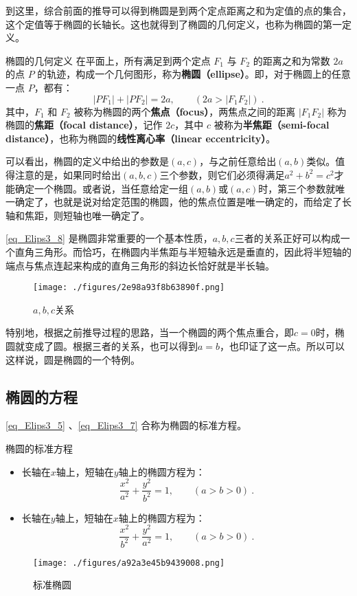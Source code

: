 到这里，综合前面的推导可以得到椭圆是到两个定点距离之和为定值的点的集合，这个定值等于椭圆的长轴长。这也就得到了椭圆的几何定义，也称为椭圆的第一定义。

\begin{definition}{椭圆的几何定义}
在平面上，所有满足到两个定点 $F_1$ 与 $F_2$ 的距离之和为常数 $2a$ 的点 $P$ 的轨迹，构成一个几何图形，称为\textbf{椭圆（ellipse）}。即，对于椭圆上的任意一点 $P$，都有：
\begin{equation}\label{eq_Elips3_9}
|PF_1| + |PF_2| = 2a ,\qquad(2a>|F_1F_2|)~.
\end{equation}
其中，$F_1$ 和 $F_2$ 被称为椭圆的两个\textbf{焦点（focus）}，两焦点之间的距离 $|F_1F_2|$ 称为椭圆的\textbf{焦距（focal distance）}，记作 $2c$，其中 $c$ 被称为\textbf{半焦距（semi-focal distance）}，也称为椭圆的\textbf{线性离心率（linear eccentricity）}。
\end{definition}

可以看出，椭圆的定义中给出的参数是$(a,c)$，与之前任意给出$(a,b)$类似。值得注意的是，如果同时给出$(a,b,c)$三个参数，则它们必须得满足$a^2+b^2=c^2$才能确定一个椭圆。或者说，当任意给定一组$(a,b)$或$(a,c)$时，第三个参数就唯一确定了，也就是说对给定范围的椭圆，他的焦点位置是唯一确定的，而给定了长轴和焦距，则短轴也唯一确定了。

\autoref{eq_Elips3_8} 是椭圆非常重要的一个基本性质，$a,b,c$三者的关系正好可以构成一个直角三角形。而恰巧，在椭圆内半焦距与半短轴永远是垂直的，因此将半短轴的端点与焦点连起来构成的直角三角形的斜边长恰好就是半长轴。
\begin{figure}[ht]
\centering
\texttt{[image: ./figures/2e98a93f8b63890f.png]}
\caption{$a,b,c$关系} \label{fig_Elips3_3}
\end{figure}
特别地，根据之前推导过程的思路，当一个椭圆的两个焦点重合，即$c=0$时，椭圆就变成了圆。根据三者的关系，也可以得到$a=b$，也印证了这一点。所以可以这样说，圆是椭圆的一个特例。

\subsection{椭圆的方程}

\autoref{eq_Elips3_5} 、\autoref{eq_Elips3_7} 合称为椭圆的标准方程。
\begin{theorem}{椭圆的标准方程}
\begin{itemize}
\item 长轴在$x$轴上，短轴在$y$轴上的椭圆方程为：
\begin{equation}\label{eq_Elips3_3}
\frac{x^2}{a^2} + \frac{y^2}{b^2} = 1,\qquad(a>b>0)~.
\end{equation}
\item 长轴在$y$轴上，短轴在$x$轴上的椭圆方程为：
\begin{equation}
\frac{x^2}{b^2} + \frac{y^2}{a^2} = 1,\qquad(a>b>0)~.
\end{equation}
\end{itemize}
\end{theorem}
\begin{figure}[ht]
\centering
\texttt{[image: ./figures/a92a3e45b9439008.png]}
\caption{标准椭圆} \label{fig_Elips3_2}
\end{figure}


